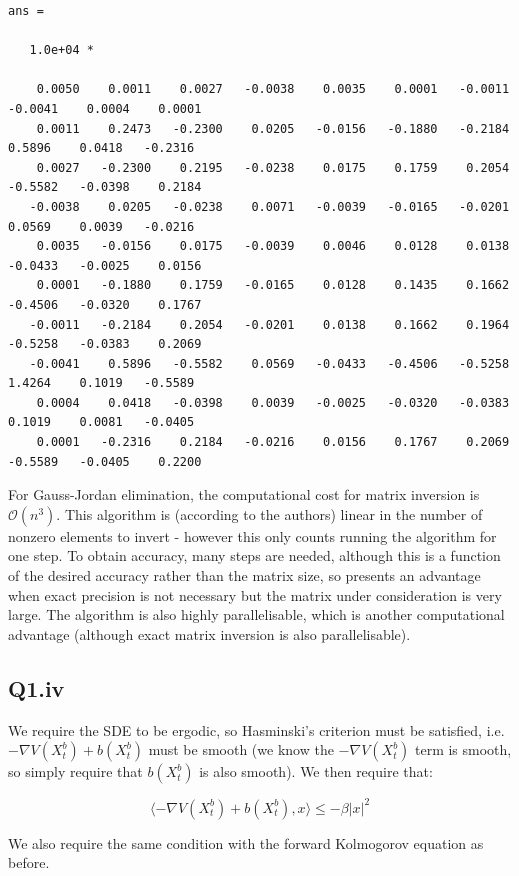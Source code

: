 \documentclass[11pt]{article} %
\begin{document}
\begin{verbatim}
ans =

   1.0e+04 *

    0.0050    0.0011    0.0027   -0.0038    0.0035    0.0001   -0.0011   -0.0041    0.0004    0.0001
    0.0011    0.2473   -0.2300    0.0205   -0.0156   -0.1880   -0.2184    0.5896    0.0418   -0.2316
    0.0027   -0.2300    0.2195   -0.0238    0.0175    0.1759    0.2054   -0.5582   -0.0398    0.2184
   -0.0038    0.0205   -0.0238    0.0071   -0.0039   -0.0165   -0.0201    0.0569    0.0039   -0.0216
    0.0035   -0.0156    0.0175   -0.0039    0.0046    0.0128    0.0138   -0.0433   -0.0025    0.0156
    0.0001   -0.1880    0.1759   -0.0165    0.0128    0.1435    0.1662   -0.4506   -0.0320    0.1767
   -0.0011   -0.2184    0.2054   -0.0201    0.0138    0.1662    0.1964   -0.5258   -0.0383    0.2069
   -0.0041    0.5896   -0.5582    0.0569   -0.0433   -0.4506   -0.5258    1.4264    0.1019   -0.5589
    0.0004    0.0418   -0.0398    0.0039   -0.0025   -0.0320   -0.0383    0.1019    0.0081   -0.0405
    0.0001   -0.2316    0.2184   -0.0216    0.0156    0.1767    0.2069   -0.5589   -0.0405    0.2200
\end{verbatim}
\normalsize
For Gauss-Jordan elimination, the computational cost for matrix inversion is $\mathcal{O}(n^{3})$. This algorithm is (according to the authors) linear in the number of nonzero elements to invert - however this only counts running the algorithm for one step. To obtain accuracy, many steps are needed, although this is a function of the desired accuracy rather than the matrix size, so presents an advantage when exact precision is not necessary but the matrix under consideration is very large. The algorithm is also highly parallelisable, which is another computational advantage (although exact matrix inversion is also parallelisable).

\subsection{Q1.iv}
We require the SDE to be ergodic, so Hasminski's criterion must be satisfied, i.e. $-\nabla V(X^{b}_{t}) + b(X^{b}_{t})$ must be smooth (we know the $-\nabla V(X^{b}_{t})$ term is smooth, so simply require that $b(X^{b}_{t})$ is also smooth). We then require that:

\begin{equation}
\langle -\nabla V(X^{b}_{t}) + b(X^{b}_{t}), x \rangle \leq -\beta|x|^{2}
\end{equation}

We also require the same condition with the forward Kolmogorov equation as before.
\end{document}
